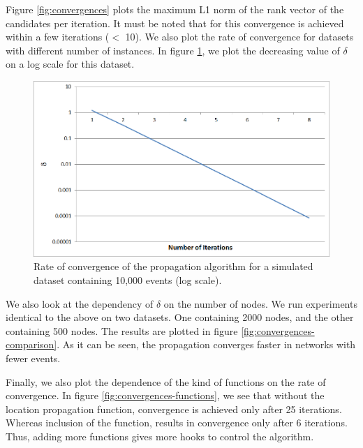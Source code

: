 Figure \ref{fig:convergences} plots the maximum L1 norm of the rank vector of the candidates per iteration. It must be noted that for this convergence is achieved within a few iterations ($<$ 10). We also plot the rate of convergence for datasets with different number of instances. In figure \ref{fig:convergences-log-scale}, we plot the decreasing value of $\delta$ on a log scale for this dataset.

\begin{figure}[h]
\centering
\includegraphics[width=\textwidth]{media/chapter6/conv/convergence-10K-log.png}
\caption{Rate of convergence of the propagation algorithm for a simulated dataset containing 10,000 events (log scale).}
\label{fig:convergences-log-scale}
\end{figure}

We also look at the dependency of $\delta$ on the number of nodes. We run experiments identical to the above on two datasets. One containing 2000 nodes, and the other containing 500 nodes. The results are plotted in figure \ref{fig:convergences-comparison}. As it can be seen, the propagation converges faster in networks with fewer events.

Finally, we also plot the dependence of the kind of functions on the rate of convergence. In figure \ref{fig:convergences-functions}, we see that without the location propagation function, convergence is achieved only after 25 iterations. Whereas inclusion of the function, results in convergence only after 6 iterations. Thus, adding more functions gives more hooks to control the algorithm.

